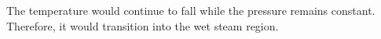 The temperature would continue to fall while the pressure remains constant. Therefore, it would transition into the wet steam region.